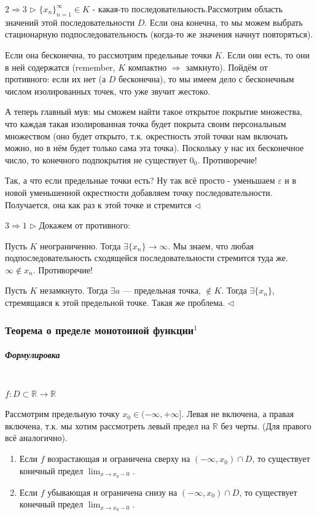 \documentclass{article}
\let\vanillasubparagraph\subparagraph
\renewcommand{\subparagraph}[1]{\vanillasubparagraph{#1}\mbox{}\\}
\begin{document}
$2 \Rightarrow 3$
$\rhd$
$\{x_n\}_{n=1}^\infty \in K$ - какая-то последовательность.Рассмотрим область значений этой последовательности $D$. Если она конечна, то мы можем выбрать стационарную подпоследовательность (когда-то же значения начнут повторяться).

Если она бесконечна, то рассмотрим предельные точки $K$. Если они есть, то они в ней содержатся (remember, $K$ компактно $\Rightarrow$ замкнуто). Пойдём от противного: если их нет (а $D$ бесконечна), то мы имеем дело с бесконечным числом изолированных точек, что уже звучит жестоко.

А теперь главный мув: мы сможем найти такое открытое покрытие множества, что каждая такая изолированная точка будет покрыта своим персональным множеством (оно будет открыто, т.к. окрестность этой точки нам включать можно, но в нём будет только сама эта точка). Поскольку у нас их бесконечное число, то конечного подпокрытия не существует $0_0$. Противоречие!

Так, а что если предельные точки есть? Ну так всё просто - уменьшаем $\varepsilon$ и в новой уменьшенной окрестности добавляем точку последовательности. Получается, она как раз к этой точке и стремится
$\lhd$

$3 \Rightarrow 1$
$\rhd$
Докажем от противного:

Пусть $K$ неограниченно. Тогда $\exists \{x_n\} \rightarrow \infty$. Мы знаем, что любая подпоследовательность сходящейся последовательности стремится туда же. $\infty \notin x_n$. Противоречие!

Пусть $K$ незамкнуто. Тогда $\exists a$ --- предельная точка, $\notin K$. Тогда $\exists \{x_n\}$, стремящаяся к этой предельной точке. Такая же проблема.
$\lhd$


\subsubsection{Теорема о пределе монотонной функции\texorpdfstring{$^1$}{}}
\subparagraph{Формулировка}
$f: D \subset\mathbb{R} \rightarrow \mathbb{R}$

Рассмотрим предельную точку $x_0 \in (-\infty, +\infty]$. Левая не включена, а правая включена, т.к. мы хотим рассмотреть левый предел на $\mathbb{R}$ без черты. (Для правого всё аналогично).

\begin{enumerate}
    \item Если $f$ возрастающая и ограничена сверху на $(-\infty, x_0) \cap D$, то существует конечный предел $\lim_{x\rightarrow x_0-0}$.
    
    \item Если $f$ убывающая и ограничена снизу на $(-\infty, x_0) \cap D$, то существует конечный предел $\lim_{x\rightarrow x_0-0}$.
\end{enumerate}
\end{document}
